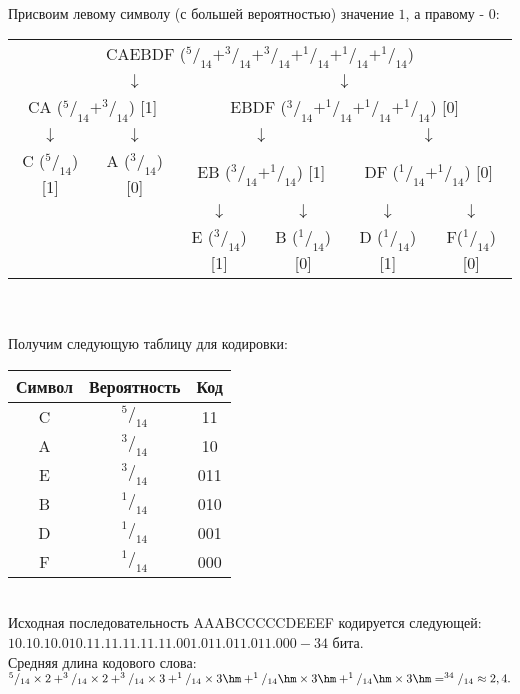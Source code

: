 \\Присвоим левому символу (с большей вероятностью) значение $1$, а правому - $0$:
\begin{table}[h]
\centering
\begin{tabular}{c c c c c c}
\multicolumn{6}{c}{CAEBDF ($^5/_{14} + ^3/_{14} + ^3/_{14} + ^1/_{14} + ^1/_{14} + ^1/_{14}$)} \\
& $\downarrow$ & \multicolumn{4}{c}{$\downarrow$} \\
\multicolumn{2}{c}{CA ($^5/_{14} + ^3/_{14}$) [1]} & \multicolumn{4}{c}{EBDF ($^3/_{14} + ^1/_{14} + ^1/_{14} + ^1/_{14}$) [0]} \\
$\downarrow$ & $\downarrow$ & \multicolumn{2}{c}{$\downarrow$} & \multicolumn{2}{c}{$\downarrow$} \\
C ($^5/_{14}$) [1] & A ($^3/_{14}$) [0] & \multicolumn{2}{c}{EB ($^3/_{14} + ^1/_{14}$) [1]} & \multicolumn{2}{c}{DF ($^1/_{14} + ^1/_{14}$) [0]} \\
 & & $\downarrow$ & $\downarrow$ & $\downarrow$ & $\downarrow$ \\
 & & E ($^3/_{14}$) [1] & B ($^1/_{14}$) [0] & D ($^1/_{14}$) [1] & F($^1/_{14}$) [0] \\
\end{tabular}
\end{table}
\\
\\Получим следующую таблицу для кодировки:
\begin{table}[h]
\begin{tabular}{|c|c|c|}
\hline
Символ & Вероятность & Код \\
\hline
C & $^5/_{14}$ & 11 \\
A & $^3/_{14}$ & 10 \\
E & $^3/_{14}$ & 011 \\
B & $^1/_{14}$ & 010 \\
D & $^1/_{14}$ & 001 \\
F & $^1/_{14}$ & 000 \\
\hline
\end{tabular}
\end{table}
\\Исходная последовательность AAABCCCCCDEEEF кодируется следующей: $10.10.10.010.11.11.11.11.11.001.011.011.011.000 - 34$ бита.
\\Средняя длина кодового слова: $^5/_{14}\times 2 + ^3/_{14}\times 2 + ^3/_{14}\times 3 + ^1/_{14}\times 3\hm + ^1/_{14}\hm\times 3\hm + ^1/_{14}\hm\times 3\hm = ^{34}/_{14} \approx 2,4.$
